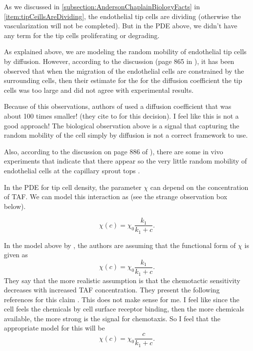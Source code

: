 \begin{strangeObs}
	As we discussed in \autoref{subsection:AndersonChaplainBiologyFacts} in \autoref{item:tipCeillsAreDividing}, the endothelial tip cells are dividing (otherwise the vascularization will not be completed). But in the PDE above, we didn't have any term for the tip cells proliferating or degrading.
\end{strangeObs}

\begin{strangeObs}
	As explained above, we are modeling the random mobility of endothelial tip cells by diffusion. However, according to the discussion (page 865 in \cite{Anderson1998}), it has been observed \cite{Rupnick1988} that when the migration of the endothelial cells are constrained by the surrounding cells, then their estimate for the for the diffusion coefficient the tip cells was too large and did not agree with experimental results. 
	
	Because of this observations, authors of \cite{Anderson1998} used a diffusion coefficient that was about 100 times smaller! (they cite to \cite{Bray2000} for this decision). I feel like this is not a good approach! The biological observation above is a signal that capturing the random mobility of the cell simply by diffusion is not a correct framework to use.
	
	Also, according to the discussion on page 886 of \cite{Anderson1998}), there are some in vivo experiments that indicate that there appear so the very little random mobility of endothelial cells at the capillary sprout tops \cite{Paweletz1989,Paku1991}.
\end{strangeObs}
In the PDE for tip cell density, the parameter $ \chi $ can depend on the concentration of TAF. We can model this interaction as (see the strange observation box below).

\[ \chi(c) = \chi_0 \frac{k_1}{k_1+c}. \] 

\begin{strangeObs}
	In the model above by \cite{Anderson1998}, the authors are assuming that the functional form of $ \chi $ is given as
	\[ \chi(c) = \chi_0 \frac{k_1}{k_1+c}. \] 
	They say that the more realistic assumption is that the chemotactic sensitivity decreases with increased TAF concentration. They present the following references for this claim \cite{Lapidus1976,Lauffenburger1984,Sherratt1994,Woodward1995,Olsen1997}. This does not make sense for me. I feel like since the cell feels the chemicals by cell surface receptor binding, then the more chemicals available, the more strong is the signal for chemotaxis. So I feel that the appropriate model for this will be
	\[ \chi(c) = \chi_0\frac{c}{k_1 + c}. \]
\end{strangeObs}

